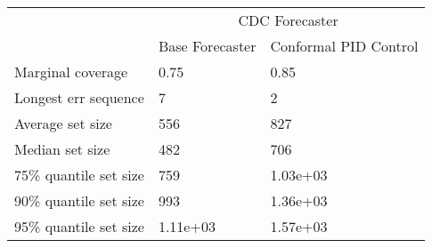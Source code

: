 \begin{tabular}{lll}
\toprule
& \multicolumn{2}{c}{CDC Forecaster} \\
& Base Forecaster & Conformal PID Control \\
\midrule
Marginal coverage & 0.75 & 0.85 \\
Longest err sequence & 7 & 2 \\
Average set size & 556 & 827 \\
Median set size & 482 & 706 \\
75\% quantile set size & 759 & 1.03e+03 \\
90\% quantile set size & 993 & 1.36e+03 \\
95\% quantile set size & 1.11e+03 & 1.57e+03 \\
\bottomrule
\end{tabular}
